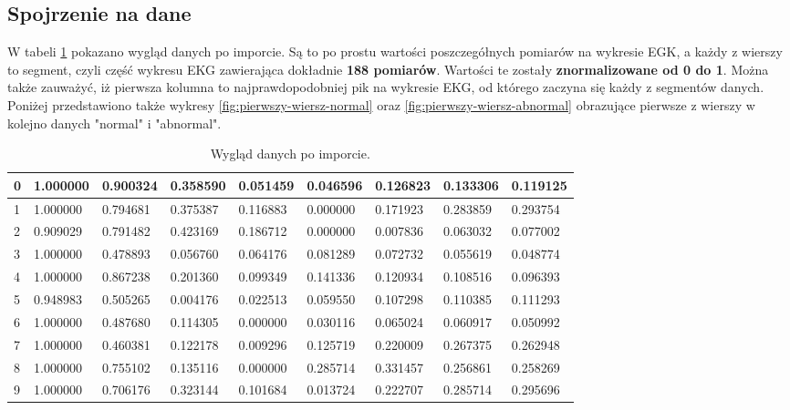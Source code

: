 \documentclass[12pt,a4paper]{article}
\begin{document}
\subsection{Spojrzenie na dane}
W tabeli \ref{tab:dane_po_imporcie} pokazano wygląd danych po imporcie. Są to po prostu wartości poszczegółnych pomiarów na wykresie EGK, a każdy z wierszy to segment, czyli część wykresu EKG zawierająca dokładnie \textbf{188 pomiarów}. Wartości te zostały \textbf{znormalizowane od 0 do 1}. Można także zauważyć, iż pierwsza kolumna to najprawdopodobniej pik na wykresie EKG, od którego zaczyna się każdy z segmentów danych. Poniżej przedstawiono także wykresy \ref{fig:pierwszy-wiersz-normal} oraz \ref{fig:pierwszy-wiersz-abnormal} obrazujące pierwsze z wierszy w kolejno danych "normal" i "abnormal".

\begin{table}[H]
    \centering
    \begin{tabular}{|l|l|l|l|l|l|l|l|l|}
    \hline
        0 & 1.000000 & 0.900324 & 0.358590 & 0.051459 & 0.046596 & 0.126823 & 0.133306 & 0.119125 \\ \hline
        1 & 1.000000 & 0.794681 & 0.375387 & 0.116883 & 0.000000 & 0.171923 & 0.283859 & 0.293754 \\ \hline
        2 & 0.909029 & 0.791482 & 0.423169 & 0.186712 & 0.000000 & 0.007836 & 0.063032 & 0.077002 \\ \hline
        3 & 1.000000 & 0.478893 & 0.056760 & 0.064176 & 0.081289 & 0.072732 & 0.055619 & 0.048774 \\ \hline
        4 & 1.000000 & 0.867238 & 0.201360 & 0.099349 & 0.141336 & 0.120934 & 0.108516 & 0.096393 \\ \hline
        5 & 0.948983 & 0.505265 & 0.004176 & 0.022513 & 0.059550 & 0.107298 & 0.110385 & 0.111293 \\ \hline
        6 & 1.000000 & 0.487680 & 0.114305 & 0.000000 & 0.030116 & 0.065024 & 0.060917 & 0.050992 \\ \hline
        7 & 1.000000 & 0.460381 & 0.122178 & 0.009296 & 0.125719 & 0.220009 & 0.267375 & 0.262948 \\ \hline
        8 & 1.000000 & 0.755102 & 0.135116 & 0.000000 & 0.285714 & 0.331457 & 0.256861 & 0.258269 \\ \hline
        9 & 1.000000 & 0.706176 & 0.323144 & 0.101684 & 0.013724 & 0.222707 & 0.285714 & 0.295696 \\ \hline
    \end{tabular}
    \caption{Wygląd danych po imporcie.}
    \label{tab:dane_po_imporcie}
\end{table}
\end{document}
